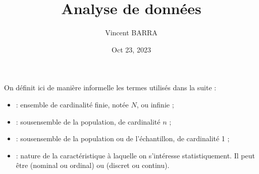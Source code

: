 \documentclass[letterpaper,10pt,english]{jupyterBook}
\title{Analyse de données}
\date{Oct 23, 2023}
\author{Vincent BARRA}
\begin{document}
\pagestyle{empty}
\sphinxmaketitle
\pagestyle{plain}
\sphinxtableofcontents
\pagestyle{normal}
\label{\detokenize{intro::doc}}


\begin{DUlineblock}{0em}
\item[] 
\end{DUlineblock}

\sphinxAtStartPar
On définit ici de manière informelle les termes utilisés dans la suite :

\ignorespaces \begin{itemize}
\item {} 
\sphinxAtStartPar
{} : ensemble de cardinalité finie, notée \(N\), ou infinie ;

\end{itemize}

\ignorespaces \begin{itemize}
\item {} 
\sphinxAtStartPar
{} : sous\sphinxhyphen{}ensemble de la population, de cardinalité \(n\) ;

\end{itemize}

\ignorespaces \begin{itemize}
\item {} 
\sphinxAtStartPar
{} : sous\sphinxhyphen{}ensemble de la population ou de l’échantillon, de cardinalité 1 ;

\end{itemize}

\ignorespaces \begin{itemize}
\item {} 
\sphinxAtStartPar
{} : nature de la caractéristique à laquelle on s’intéresse statistiquement. Il peut être  (nominal ou ordinal) ou  (discret ou continu).

\end{itemize}

\begin{DUlineblock}{0em}
\item[] 
\end{DUlineblock}
\end{document}
